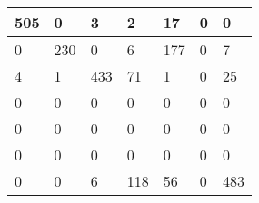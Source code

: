 \begin{tabular}{lllllll}
\hline
  505 & 0 & 3 & 2 & 17 & 0 & 0 \\
\hline
  0 & 230 & 0 & 6 & 177 & 0 & 7 \\
\hline
  4 & 1 & 433 & 71 & 1 & 0 & 25 \\
\hline
  0 & 0 & 0 & 0 & 0 & 0 & 0 \\
\hline
  0 & 0 & 0 & 0 & 0 & 0 & 0 \\
\hline
  0 & 0 & 0 & 0 & 0 & 0 & 0 \\
\hline
  0 & 0 & 6 & 118 & 56 & 0 & 483 \\
\hline
\end{tabular}
